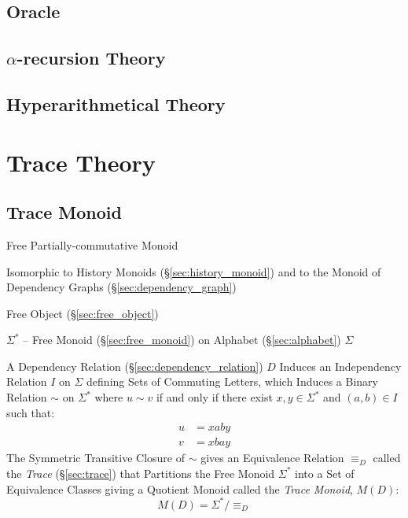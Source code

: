 \subsection{Oracle}\label{sec:oracle}

\subsection{$\alpha$-recursion Theory}\label{sec:alpha_recursion}

\subsection{Hyperarithmetical Theory}\label{sec:hyperarithmetical_theory}



\section{Trace Theory}\label{sec:trace_theory}

\subsection{Trace Monoid}\label{sec:trace_monoid}

Free Partially-commutative Monoid

Isomorphic to History Monoids (\S\ref{sec:history_monoid}) and to the
Monoid of Dependency Graphs (\S\ref{sec:dependency_graph})

Free Object (\S\ref{sec:free_object})

$\Sigma^*$ -- Free Monoid (\S\ref{sec:free_monoid}) on Alphabet
(\S\ref{sec:alphabet}) $\Sigma$

A Dependency Relation (\S\ref{sec:dependency_relation}) $D$ Induces an
Independency Relation $I$ on $\Sigma$ defining Sets of Commuting
Letters, which Induces a Binary Relation $\sim$ on $\Sigma^*$ where $u
\sim v$ if and only if there exist $x,y \in \Sigma^*$ and $(a,b) \in
I$ such that:
\begin{align*}
  u &= xaby \\
  v &= xbay
\end{align*}
The Symmetric Transitive Closure of $\sim$ gives an Equivalence
Relation $\equiv_D$ called the \emph{Trace} (\S\ref{sec:trace}) that
Partitions the Free Monoid $\Sigma^*$ into a Set of Equivalence
Classes giving a Quotient Monoid called the \emph{Trace Monoid},
$M(D)$:
\[
  M(D) = \Sigma^*/\equiv_D
\]

